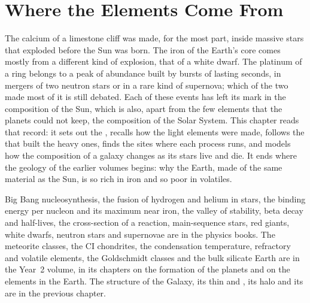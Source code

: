 \chapter{Where the Elements Come From}\label{ch:b3:origin-of-elements}

The calcium of a limestone cliff was made, for the most part, inside
massive stars that exploded before the Sun was born. The iron of the
Earth's core comes mostly from a different kind of explosion, that of a
white dwarf. The platinum of a ring belongs to a peak of abundance built
by bursts of  lasting seconds, in mergers of two neutron
stars or in a rare kind of supernova; which of the two made most of it is
still debated.
Each of these events has left its mark in the composition of the Sun,
which is also, apart from the few elements that the planets could not
keep, the composition of the Solar System. This chapter reads that
record: it sets out the , recalls how the light elements
were made, follows the  that built the heavy ones, finds
the sites where each process runs, and models how the composition of a
galaxy changes as its stars live and die. It ends where the geology of
the earlier volumes begins: why the Earth, made of the same material as
the Sun, is so rich in iron and so poor in volatiles.

\begin{recall}
Big Bang nucleosynthesis, the fusion of hydrogen and helium in stars,
the binding energy per nucleon and its maximum near iron, the valley of
stability, beta decay and half-lives, the cross-section of a reaction,
main-sequence stars, red giants, white dwarfs, neutron stars and
supernovae are in the physics books. The meteorite classes, the CI
chondrites, the condensation temperature, refractory and volatile
elements, the Goldschmidt classes and the bulk silicate Earth are in the
Year~2 volume, in its chapters on the formation of the planets and on
the elements in the Earth. The structure of the Galaxy, its thin and
, its halo and its  are in the previous
chapter.
\end{recall}

